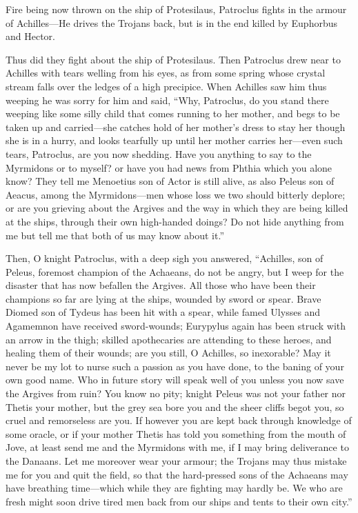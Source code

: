 
Fire being now thrown on the ship of Protesilaus, Patroclus fights in the
armour of Achilles—He drives the Trojans back, but is in the end
killed by Euphorbus and Hector.

Thus did they fight about the ship of Protesilaus. Then Patroclus drew
near to Achilles with tears welling from his eyes, as from some spring
whose crystal stream falls over the ledges of a high precipice. When
Achilles saw him thus weeping he was sorry for him and said, “Why,
Patroclus, do you stand there weeping like some silly child that comes
running to her mother, and begs to be taken up and carried—she
catches hold of her mother’s dress to stay her though she is in a hurry,
and looks tearfully up until her mother carries her—even such tears,
Patroclus, are you now shedding. Have you anything to say to the Myrmidons
or to myself? or have you had news from Phthia which you alone know? They
tell me Menoetius son of Actor is still alive, as also Peleus son of
Aeacus, among the Myrmidons—men whose loss we two should bitterly
deplore; or are you grieving about the Argives and the way in which they
are being killed at the ships, through their own high-handed doings? Do
not hide anything from me but tell me that both of us may know about it.”

Then, O knight Patroclus, with a deep sigh you answered, “Achilles, son of
Peleus, foremost champion of the Achaeans, do not be angry, but I weep for
the disaster that has now befallen the Argives. All those who have been
their champions so far are lying at the ships, wounded by sword or spear.
Brave Diomed son of Tydeus has been hit with a spear, while famed Ulysses
and Agamemnon have received sword-wounds; Eurypylus again has been struck
with an arrow in the thigh; skilled apothecaries are attending to these
heroes, and healing them of their wounds; are you still, O Achilles, so
inexorable? May it never be my lot to nurse such a passion as you have
done, to the baning of your own good name. Who in future story will speak
well of you unless you now save the Argives from ruin? You know no pity;
knight Peleus was not your father nor Thetis your mother, but the grey sea
bore you and the sheer cliffs begot you, so cruel and remorseless are you.
If however you are kept back through knowledge of some oracle, or if your
mother Thetis has told you something from the mouth of Jove, at least send
me and the Myrmidons with me, if I may bring deliverance to the Danaans.
Let me moreover wear your armour; the Trojans may thus mistake me for you
and quit the field, so that the hard-pressed sons of the Achaeans may have
breathing time—which while they are fighting may hardly be. We who
are fresh might soon drive tired men back from our ships and tents to
their own city.”

